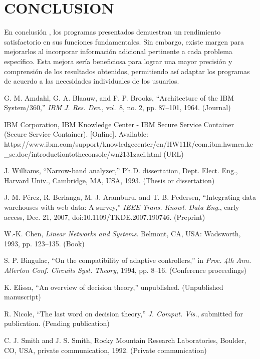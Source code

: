 \documentclass{IEEEcsmag}
\begin{document}
\clearpage


\clearpage


\clearpage


\clearpage


\clearpage


\clearpage


\clearpage


\section{CONCLUSION}
En conclusión , los programas presentados demuestran un rendimiento satisfactorio en sus funciones fundamentales. Sin embargo, existe margen para mejorarlos al incorporar información adicional pertinente a cada problema específico. Esta mejora sería beneficiosa para lograr una mayor precisión y comprensión de los resultados obtenidos, permitiendo así adaptar los programas de acuerdo a las necesidades individuales de los usuarios.
\vspace*{-8pt}


\def\refname{REFERENCES}

\begin{thebibliography}{1}

G. M. Amdahl, G. A. Blaauw, and F. P. Brooks, ``Architecture of the IBM System/360,'' {\it IBM J. Res. Dev}., vol. 8, no. 2, pp. 87--101, 1964. (Journal)

IBM Corporation, IBM Knowledge Center - IBM Secure Service Container (Secure Service Container). [Online]. Available: {https://www.ibm.com/support/\break knowledgecenter/en/HW11R/com.ibm.hwmca.kc\_se.doc/\break introductiontotheconsole/wn2131zaci.html} (URL)

J. Williams, ``Narrow-band analyzer,'' Ph.D. dissertation, Dept.  Elect. Eng., Harvard Univ., Cambridge, MA, USA, 1993. (Thesis or dissertation)

J. M. P\'erez, R. Berlanga, M. J. Aramburu, and T. B. Pedersen, ``Integrating data warehouses with web data: A survey,'' {\it IEEE Trans. Knowl. Data Eng}., early access, Dec. 21, 2007, doi:10.1109/TKDE.2007.190746. (Preprint)

W.-K. Chen, {\it Linear Networks and Systems}. Belmont, CA, USA: Wadsworth,  1993, pp. 123--135. (Book)

S. P. Bingulac, ``On the compatibility of adaptive controllers,'' in {\it Proc. 4th Ann. Allerton Conf. Circuits Syst. Theory}, 1994,  pp. 8--16. (Conference proceedings)

K. Elissa, ``An overview of decision theory,'' unpublished. (Unpublished manuscript)

R. Nicole, ``The last word on decision theory,'' {\it J. Comput. Vis.}, submitted for publication. (Pending publication)

C. J. Smith and J. S. Smith, Rocky Mountain Research Laboratories, Boulder, CO, USA, private communication, 1992. (Private communication)
\end{thebibliography}\vspace*{-8pt}
\end{document}
